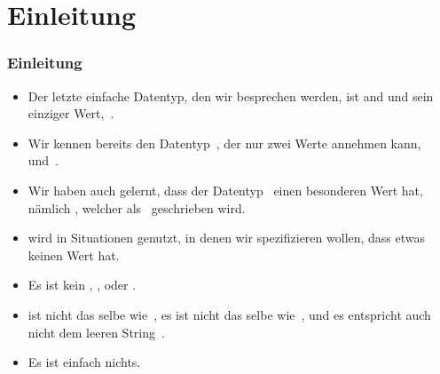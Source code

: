 \documentclass[aspectratio=169,mathserif,notheorems]{beamer}%
\subtitle{12.~None}%
\begin{document}
%
%
\startPresentation%
%
\section{Einleitung}%
\begin{frame}%
\frametitle{Einleitung}%
\begin{itemize}%
\item Der letzte einfache Datentyp, den wir besprechen werden, ist  and und sein einziger Wert,~.%
\item<2-> Wir kennen bereits den Datentyp~, der nur zwei Werte annehmen kann,~ und~.%
\item<3-> Wir haben auch gelernt, dass der Datentyp~ einen besonderen Wert hat, nämlich , welcher als~ geschrieben wird.%
\item<4->  wird in Situationen genutzt, in denen wir spezifizieren wollen, dass etwas keinen Wert hat.%
\item<5-> Es ist kein , ,  oder .%
\item<6->  ist nicht das selbe wie~, es ist nicht das selbe wie~, und es entspricht auch nicht dem leeren String~\pythonil{\"\"}.%
\item<7-> Es ist einfach \alert{nichts}.%
\end{itemize}%
\end{frame}%
%
\end{document}
